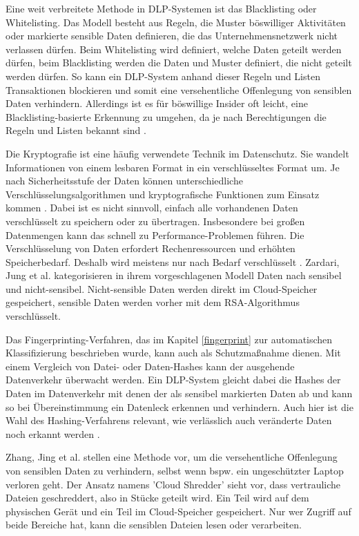 Eine weit verbreitete Methode in DLP-Systemen ist das Blacklisting oder Whitelisting. Das Modell besteht aus Regeln, die Muster böswilliger Aktivitäten oder markierte sensible Daten definieren, die das Unternehmensnetzwerk nicht verlassen dürfen. Beim Whitelisting wird definiert, welche Daten geteilt werden dürfen, beim Blacklisting werden die Daten und Muster definiert, die nicht geteilt werden dürfen. So kann ein DLP-System anhand dieser Regeln und Listen Transaktionen blockieren und somit eine versehentliche Offenlegung von sensiblen Daten verhindern. Allerdings ist es für böswillige Insider oft leicht, eine Blacklisting-basierte Erkennung zu umgehen, da je nach Berechtigungen die Regeln und Listen bekannt sind \cite{Costante.2016}.

Die Kryptografie ist eine häufig verwendete Technik im Datenschutz. Sie wandelt Informationen von einem lesbaren Format in ein verschlüsseltes Format um. Je nach Sicherheitsstufe der Daten können unterschiedliche Verschlüsselungsalgorithmen und kryptografische Funktionen zum Einsatz kommen \cite{HerreraMontano.2022}. Dabei ist es nicht sinnvoll, einfach alle vorhandenen Daten verschlüsselt zu speichern oder zu übertragen. Insbesondere bei großen Datenmengen kann das schnell zu Performance-Problemen führen. Die Verschlüsselung von Daten erfordert Rechenressourcen und erhöhten Speicherbedarf. Deshalb wird meistens nur nach Bedarf verschlüsselt \cite{Arki.2023}.
Zardari, Jung et al. \cite{Zardari.2014} kategorisieren in ihrem vorgeschlagenen Modell Daten nach sensibel und nicht-sensibel. Nicht-sensible Daten werden direkt im Cloud-Speicher gespeichert, sensible Daten werden vorher mit dem RSA-Algorithmus verschlüsselt.

Das Fingerprinting-Verfahren, das im Kapitel \ref{fingerprint} zur automatischen Klassifizierung beschrieben wurde, kann auch als Schutzmaßnahme dienen. Mit einem Vergleich von Datei- oder Daten-Hashes kann der ausgehende Datenverkehr überwacht werden. Ein DLP-System gleicht dabei die Hashes der Daten im Datenverkehr mit denen der als sensibel markierten Daten ab und kann so bei Übereinstimmung ein Datenleck erkennen und verhindern. Auch hier ist die Wahl des Hashing-Verfahrens relevant, wie verlässlich auch veränderte Daten noch erkannt werden \cite{HerreraMontano.2022}.

Zhang, Jing et al. \cite{Zhang.2011} stellen eine Methode vor, um die versehentliche Offenlegung von sensiblen Daten zu verhindern, selbst wenn bspw. ein ungeschützter Laptop verloren geht. Der Ansatz namens 'Cloud Shredder' sieht vor, dass vertrauliche Dateien geschreddert, also in Stücke geteilt wird. Ein Teil wird auf dem physischen Gerät und ein Teil im Cloud-Speicher gespeichert. Nur wer Zugriff auf beide Bereiche hat, kann die sensiblen Dateien lesen oder verarbeiten.

